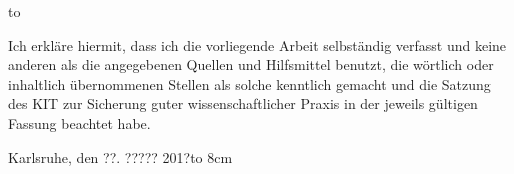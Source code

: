 \thispagestyle{empty}
\vspace*{32\baselineskip}
\hbox to \textwidth{\hrulefill}
\par
Ich erkläre hiermit, dass ich die vorliegende Arbeit selbständig verfasst und
keine anderen als die angegebenen Quellen und Hilfsmittel benutzt, 
die wörtlich oder inhaltlich übernommenen Stellen als solche kenntlich 
gemacht und die Satzung des KIT zur Sicherung guter wissenschaftlicher 
Praxis in der jeweils gültigen Fassung beachtet habe.

\vspace*{2cm}
Karlsruhe, den ??. ????? 201?\hfill \hbox to 8cm{\hrulefill}

\clearpage






